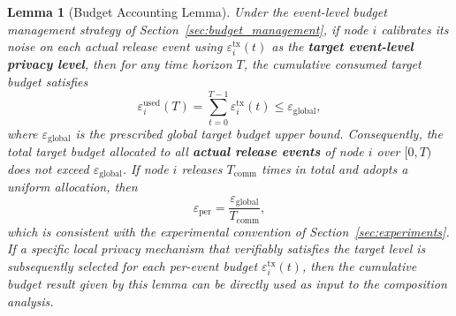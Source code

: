 \documentclass[10pt]{article}
\newtheorem{budgetlemma}[theorem]{Lemma}
\newcommand{\egl}{\varepsilon_{\text{global}}}
\begin{document}
\begin{budgetlemma}[Budget Accounting Lemma]\label{thm:privacy}
  Under the event-level budget management strategy of Section~\ref{sec:budget_management}, if node $i$ calibrates its noise on each actual release event using $\varepsilon_i^{\mathrm{tx}}(t)$ as the \textbf{target event-level privacy level}, then for any time horizon $T$, the cumulative consumed target budget satisfies
  \begin{equation}\label{eq:rho_cond}
    \varepsilon_i^{\mathrm{used}}(T)=\sum_{t=0}^{T-1}\varepsilon_i^{\mathrm{tx}}(t)\leq\egl,
  \end{equation}
  where $\egl$ is the prescribed global target budget upper bound. Consequently, the total target budget allocated to all \textbf{actual release events} of node $i$ over $[0,T)$ does not exceed $\egl$. If node $i$ releases $T_{\mathrm{comm}}$ times in total and adopts a uniform allocation, then
  \begin{equation}
    \varepsilon_{\mathrm{per}}=\frac{\egl}{T_{\mathrm{comm}}},
  \end{equation}
  which is consistent with the experimental convention of Section~\ref{sec:experiments}. If a specific local privacy mechanism that verifiably satisfies the target level is subsequently selected for each per-event budget $\varepsilon_i^{\mathrm{tx}}(t)$, then the cumulative budget result given by this lemma can be directly used as input to the composition analysis.
\end{budgetlemma}
\end{document}
